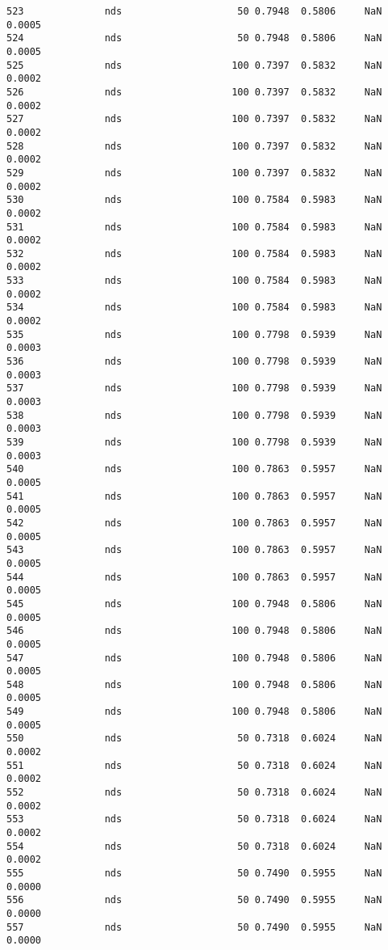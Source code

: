 \documentclass[11pt]{article}
\begin{document}
\begin{Verbatim}[commandchars=\\\{\}]
523              nds                    50 0.7948  0.5806     NaN 0.0005   
524              nds                    50 0.7948  0.5806     NaN 0.0005   
525              nds                   100 0.7397  0.5832     NaN 0.0002   
526              nds                   100 0.7397  0.5832     NaN 0.0002   
527              nds                   100 0.7397  0.5832     NaN 0.0002   
528              nds                   100 0.7397  0.5832     NaN 0.0002   
529              nds                   100 0.7397  0.5832     NaN 0.0002   
530              nds                   100 0.7584  0.5983     NaN 0.0002   
531              nds                   100 0.7584  0.5983     NaN 0.0002   
532              nds                   100 0.7584  0.5983     NaN 0.0002   
533              nds                   100 0.7584  0.5983     NaN 0.0002   
534              nds                   100 0.7584  0.5983     NaN 0.0002   
535              nds                   100 0.7798  0.5939     NaN 0.0003   
536              nds                   100 0.7798  0.5939     NaN 0.0003   
537              nds                   100 0.7798  0.5939     NaN 0.0003   
538              nds                   100 0.7798  0.5939     NaN 0.0003   
539              nds                   100 0.7798  0.5939     NaN 0.0003   
540              nds                   100 0.7863  0.5957     NaN 0.0005   
541              nds                   100 0.7863  0.5957     NaN 0.0005   
542              nds                   100 0.7863  0.5957     NaN 0.0005   
543              nds                   100 0.7863  0.5957     NaN 0.0005   
544              nds                   100 0.7863  0.5957     NaN 0.0005   
545              nds                   100 0.7948  0.5806     NaN 0.0005   
546              nds                   100 0.7948  0.5806     NaN 0.0005   
547              nds                   100 0.7948  0.5806     NaN 0.0005   
548              nds                   100 0.7948  0.5806     NaN 0.0005   
549              nds                   100 0.7948  0.5806     NaN 0.0005   
550              nds                    50 0.7318  0.6024     NaN 0.0002   
551              nds                    50 0.7318  0.6024     NaN 0.0002   
552              nds                    50 0.7318  0.6024     NaN 0.0002   
553              nds                    50 0.7318  0.6024     NaN 0.0002   
554              nds                    50 0.7318  0.6024     NaN 0.0002   
555              nds                    50 0.7490  0.5955     NaN 0.0000   
556              nds                    50 0.7490  0.5955     NaN 0.0000   
557              nds                    50 0.7490  0.5955     NaN 0.0000   

\end{Verbatim}
\end{document}
